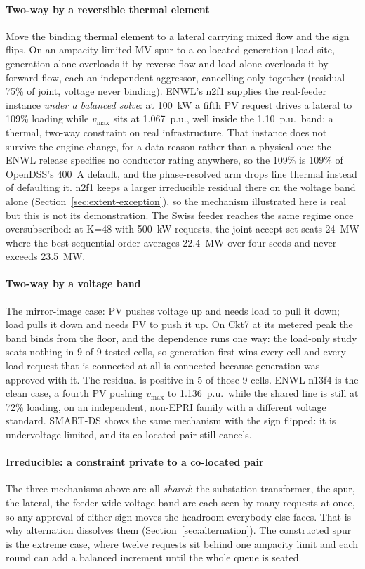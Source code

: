 \documentclass[review,authoryear,12pt]{elsarticle}
\begin{document}
\paragraph{Two-way by a reversible thermal element}
Move the binding thermal element to a lateral carrying mixed flow and the
sign flips. On an ampacity-limited MV spur to a co-located generation+load
site, generation alone overloads it by reverse flow and load alone overloads
it by forward flow, each an independent aggressor, cancelling only
together (residual 75\% of joint, voltage never binding). ENWL's n2f1
supplies the real-feeder instance \emph{under a balanced solve}: at 100~kW a
fifth PV request drives a lateral to 109\% loading while $v_{\max}$ sits at
1.067~p.u., well inside the 1.10~p.u.\ band: a thermal, two-way constraint
on real infrastructure. That instance does not survive the engine change, for a
data reason rather than a physical one: the ENWL release specifies no conductor
rating anywhere, so the 109\% is 109\% of OpenDSS's 400~A default, and the
phase-resolved arm drops line thermal instead of defaulting it. n2f1 keeps a
larger irreducible residual there on the voltage band alone
(Section~\ref{sec:extent-exception}), so the mechanism illustrated here is real
but this is not its demonstration.
The Swiss feeder reaches the same regime once oversubscribed: at K=48 with
500~kW requests, the joint accept-set seats 24~MW where the best sequential
order averages 22.4~MW over four seeds and never exceeds 23.5~MW.

\paragraph{Two-way by a voltage band}
The mirror-image case: PV pushes voltage up and needs load to pull it down;
load pulls it down and needs PV to push it up. On Ckt7 at its metered peak the
band binds from the floor, and the dependence runs one way: the load-only study
seats nothing in 9 of 9 tested cells, so generation-first wins every cell and
every load request that is connected at all is connected because generation was
approved with it. The residual is positive in 5 of those 9 cells. ENWL n13f4
is the clean case, a fourth PV pushing
$v_{\max}$ to 1.136~p.u.\ while the shared line is still at 72\% loading,
on an independent, non-EPRI family with a different voltage standard.
SMART-DS shows the same mechanism with the sign flipped: it is
undervoltage-limited, and its co-located pair still cancels.

\paragraph{Irreducible: a constraint private to a co-located pair}
The three mechanisms above are all \emph{shared}: the substation transformer,
the spur, the lateral, the feeder-wide voltage band are each seen by many
requests at once, so any approval of either sign moves the headroom everybody
else faces. That is why alternation dissolves them
(Section~\ref{sec:alternation}). The constructed spur is the extreme case,
where twelve requests sit behind one ampacity limit and each round can add a
balanced increment until the whole queue is seated.
\end{document}
